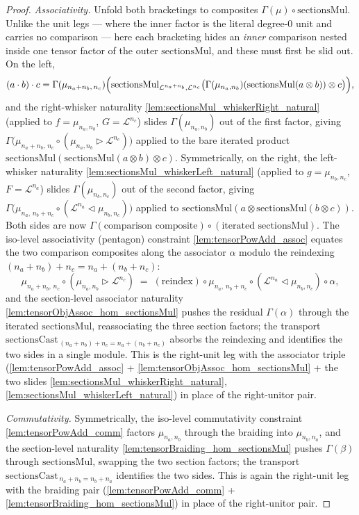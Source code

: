 \begin{proof}
  \emph{Associativity.} Unfold both bracketings to composites
  \(\Gamma(\mu) \circ \mathrm{sectionsMul}\). Unlike the unit legs --- where the
  inner factor is the literal degree-\(0\) unit and carries no comparison --- here
  each bracketing hides an \emph{inner} comparison nested inside one tensor factor of
  the outer \(\mathrm{sectionsMul}\), and these must first be slid out. On the left,
  \[
    (a \cdot b) \cdot c
      = \Gamma(\mu_{n_a+n_b,\,n_c})\Bigl(
          \mathrm{sectionsMul}_{\mathcal{L}^{n_a+n_b},\mathcal{L}^{n_c}}\bigl(
            \Gamma(\mu_{n_a,n_b})(\mathrm{sectionsMul}(a \otimes b)) \otimes c\bigr)\Bigr),
  \]
  and the right-whisker naturality \cref{lem:sectionsMul_whiskerRight_natural}
  (applied to \(f = \mu_{n_a,n_b}\), \(G = \mathcal{L}^{n_c}\)) slides
  \(\Gamma(\mu_{n_a,n_b})\) out of the first factor, giving
  \(\Gamma\bigl(\mu_{n_a+n_b,\,n_c} \circ (\mu_{n_a,n_b} \rhd \mathcal{L}^{n_c})\bigr)\)
  applied to the bare iterated product
  \(\mathrm{sectionsMul}(\mathrm{sectionsMul}(a \otimes b) \otimes c)\). Symmetrically,
  on the right, the left-whisker naturality
  \cref{lem:sectionsMul_whiskerLeft_natural} (applied to \(g = \mu_{n_b,n_c}\),
  \(F = \mathcal{L}^{n_a}\)) slides \(\Gamma(\mu_{n_b,n_c})\) out of the second factor,
  giving \(\Gamma\bigl(\mu_{n_a,\,n_b+n_c} \circ (\mathcal{L}^{n_a} \lhd \mu_{n_b,n_c})\bigr)\)
  applied to \(\mathrm{sectionsMul}(a \otimes \mathrm{sectionsMul}(b \otimes c))\). Both
  sides are now \(\Gamma(\text{comparison composite}) \circ (\text{iterated }
  \mathrm{sectionsMul})\). The iso-level associativity (pentagon) constraint
  \cref{lem:tensorPowAdd_assoc} equates the two comparison composites along the
  associator \(\alpha\) modulo the reindexing
  \((n_a+n_b)+n_c = n_a+(n_b+n_c)\):
  \[
    \mu_{n_a+n_b,\,n_c} \circ (\mu_{n_a,n_b} \rhd \mathcal{L}^{n_c})
      \;=\;
    \mathrm{(reindex)} \circ \mu_{n_a,\,n_b+n_c}
      \circ (\mathcal{L}^{n_a} \lhd \mu_{n_b,n_c}) \circ \alpha,
  \]
  and the section-level associator naturality
  \cref{lem:tensorObjAssoc_hom_sectionsMul} pushes the residual \(\Gamma(\alpha)\)
  through the iterated \(\mathrm{sectionsMul}\), reassociating the three section
  factors; the transport
  \(\mathrm{sectionsCast}_{\,(n_a+n_b)+n_c = n_a+(n_b+n_c)}\) absorbs the reindexing
  and identifies the two sides in a single module. This is the right-unit leg with the
  associator triple
  (\cref{lem:tensorPowAdd_assoc} + \cref{lem:tensorObjAssoc_hom_sectionsMul} +
  the two slides \cref{lem:sectionsMul_whiskerRight_natural},
  \cref{lem:sectionsMul_whiskerLeft_natural}) in place of the right-unitor pair.

  \emph{Commutativity.} Symmetrically, the iso-level commutativity constraint
  \cref{lem:tensorPowAdd_comm} factors \(\mu_{n_a,n_b}\) through the braiding into
  \(\mu_{n_b,n_a}\), and the section-level naturality
  \cref{lem:tensorBraiding_hom_sectionsMul} pushes \(\Gamma(\beta)\) through
  \(\mathrm{sectionsMul}\), swapping the two section factors; the transport
  \(\mathrm{sectionsCast}_{\,n_a+n_b = n_b+n_a}\) identifies the two sides. This is
  again the right-unit leg with the braiding pair (\cref{lem:tensorPowAdd_comm} +
  \cref{lem:tensorBraiding_hom_sectionsMul}) in place of the right-unitor pair.
\end{proof}
